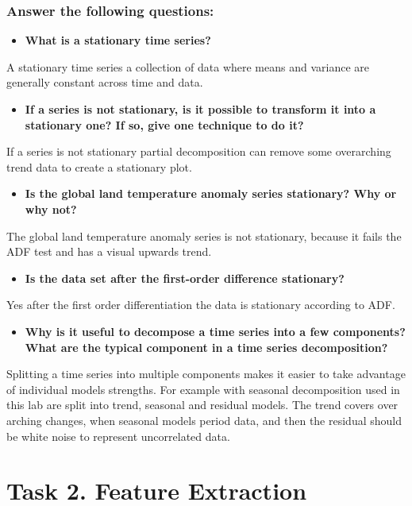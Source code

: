\documentclass{article}
\begin{document}
\subsubsection*{ Answer the following questions:}
\begin{itemize}
    \item \textbf{What is a stationary time series?}
\end{itemize}

A stationary time series a collection of data where means and variance are generally constant across time and data.
\begin{itemize}
    \item \textbf{If a series is not stationary, is it possible to transform it into a stationary one? If so, give one technique to do it?}
\end{itemize}

If a series is not stationary partial decomposition can remove some overarching trend data to create a stationary plot.

\begin{itemize}
    \item \textbf{Is the global land temperature anomaly series stationary? Why or why not?}
\end{itemize}

The global land temperature anomaly series is not stationary, because it fails the ADF test and has a visual upwards trend.

\begin{itemize}
    \item \textbf{Is the data set after the first-order difference stationary?}
\end{itemize}
Yes after the first order differentiation the data is stationary according to ADF.
\begin{itemize}
    \item \textbf{Why is it useful to decompose a time series into a few components? What are the typical component in a time series decomposition?}
\end{itemize}
Splitting a time series into multiple components makes it easier to take advantage of individual models strengths. For example with seasonal decomposition used in this lab are split into trend, seasonal and residual models. The trend covers over arching changes, when seasonal models period data, and then the residual should be white noise to represent uncorrelated data.


\section{Task 2. Feature Extraction}
\end{document}
